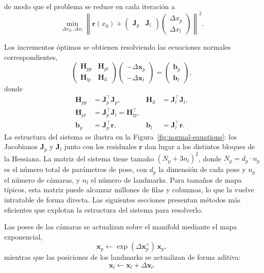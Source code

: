 de modo que el problema se reduce en cada iteración a
\[
\min_{\Delta x_p,\, \Delta x_l}
\left\|
\mathbf{r}(x_0)
+
\begin{pmatrix}
\mathbf{J}_p & \mathbf{J}_{l}
\end{pmatrix}
\begin{pmatrix}
\Delta x_p \\
\Delta x_l
\end{pmatrix}
\right\|^2.
\]

Los incrementos óptimos se obtienen resolviendo las ecuaciones normales correspondientes,
\[
\begin{pmatrix}
\mathbf{H}_{pp} & \mathbf{H}_{pl} \\
\mathbf{H}_{lp} & \mathbf{H}_{ll}
\end{pmatrix}
\begin{pmatrix}
-\Delta\mathbf{x}_p \\
-\Delta\mathbf{x}_l
\end{pmatrix}
=
\begin{pmatrix}
\mathbf{b}_p \\
\mathbf{b}_l
\end{pmatrix},
\]
donde
\begin{align}
\mathbf{H}_{pp} &= \mathbf{J}_p^\top \mathbf{J}_p, &
\mathbf{H}_{ll} &= \mathbf{J}_l^\top \mathbf{J}_l, \\
\mathbf{H}_{pl} &= \mathbf{J}_p^\top \mathbf{J}_l = \mathbf{H}_{lp}^\top, \\
\mathbf{b}_p    &= \mathbf{J}_p^\top \mathbf{r},    &
\mathbf{b}_l    &= \mathbf{J}_l^\top \mathbf{r}.
\end{align}
La estructura del sistema se ilustra en la Figura~\ref{fig:normal-equations}: los Jacobianos $\mathbf{J}_p$ y $\mathbf{J}_l$ junto con los residuales $\mathbf{r}$ dan lugar a los distintos bloques de la Hessiana. La matriz del sistema tiene tamaño $(N_p + 3n_l)^2$, donde $N_p = d_p \cdot n_p$ es el número total de parámetros de pose, con $d_p$ la dimensión de cada pose y $n_p$ el número de cámaras, y $n_l$ el número de landmarks. Para tamaños de mapa típicos, esta matriz puede alcanzar millones de filas y columnas, lo que la vuelve intratable de forma directa. Las siguientes secciones presentan métodos más eficientes que explotan la estructura del sistema para resolverlo.

Las poses de las cámaras se actualizan sobre el manifold mediante el mapa exponencial,
\[
\mathbf{x}_p
\leftarrow
\exp(\Delta \mathbf{x}_p^\wedge)\,\mathbf{x}_p,
\]
mientras que las posiciones de los landmarks se actualizan de forma aditiva:
\[
\mathbf{x}_l
\leftarrow
\mathbf{x}_l + \Delta \mathbf{x}_l.
\]

